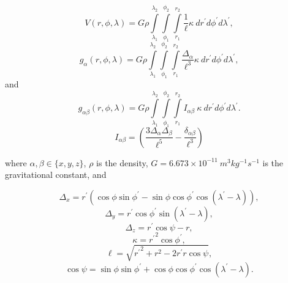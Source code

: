\documentclass[paper,twocolumn,twoside]{geophysics}
\begin{document}
\begin{equation}
    V(r,\phi,\lambda) = G \rho
        \int\limits_{\lambda_1}^{\lambda_2}
        \int\limits_{\phi_1}^{\phi_2}
        \int\limits_{r_1}^{r_2}
        \frac{1}{\ell}
        \kappa\  dr^\prime d\phi^\prime d\lambda^\prime,
    \label{eq:tesspot}
\end{equation}
\begin{equation}
    g_{\alpha}(r,\phi,\lambda) = G \rho
        \int\limits_{\lambda_1}^{\lambda_2}
        \int\limits_{\phi_1}^{\phi_2}
        \int\limits_{r_1}^{r_2}
        \frac{\Delta_\alpha}{\ell^3}
        \kappa\ dr^\prime d\phi^\prime d\lambda^\prime,
    \label{eq:tessgrav}
\end{equation}
\noindent
and
\begin{equation}
    g_{\alpha\beta}(r,\phi,\lambda) = G \rho
        \int\limits_{\lambda_1}^{\lambda_2}
        \int\limits_{\phi_1}^{\phi_2}
        \int\limits_{r_1}^{r_2}
        I_{\alpha\beta}
        \ \kappa\ dr^\prime d\phi^\prime d\lambda^\prime.
    \label{eq:tesstensor}
\end{equation}
\begin{equation}
    I_{\alpha\beta} =
    \left(
        \frac{3\Delta_{\alpha} \Delta_{\beta}}{\ell^5} -
        \frac{\delta_{\alpha\beta}}{\ell^3}
    \right)
    \label{eq:tesstensorkernel}
\end{equation}

\noindent
where $\alpha, \beta \in \{x, y, z\}$,
$\rho$ is the density,
$G = 6.673\times10^{-11}\ m^3kg^{-1}s^{-1}$ is the gravitational constant,
and

\begin{equation}
    \Delta_x = r^\prime(\cos\phi\sin\phi^\prime - \sin\phi\cos\phi^\prime
               \cos(\lambda^\prime - \lambda)),
\end{equation}
\begin{equation}
    \Delta_y = r^\prime \cos \phi^\prime \sin(\lambda^\prime - \lambda),
\end{equation}
\begin{equation}
    \Delta_z = r^\prime \cos \psi - r,
\end{equation}
\begin{equation}
    \kappa = {r^\prime}^2 \cos \phi^\prime,
\end{equation}
\begin{equation}
    \ell = \sqrt{{r^\prime}^2 + r^2 - 2 r^\prime r \cos \psi},
\end{equation}
\begin{equation}
    \cos\psi = \sin\phi\sin\phi^\prime + \cos\phi\cos\phi^\prime
                 \cos(\lambda^\prime - \lambda).
\end{equation}
\end{document}
